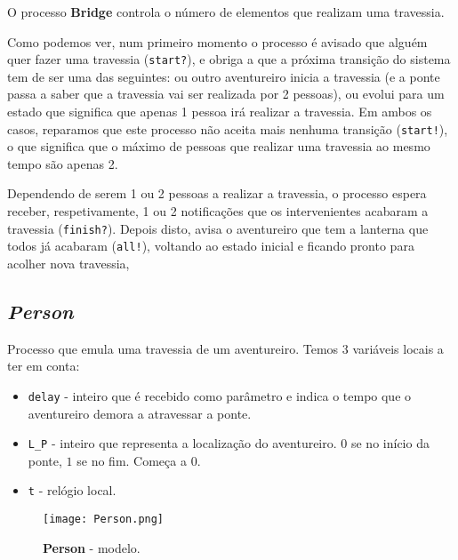 \documentclass[12pt]{extarticle}
\begin{document}
O processo \textbf{Bridge} controla o número de elementos que realizam uma travessia.

Como podemos ver, num primeiro momento o processo é avisado que alguém quer fazer uma travessia (\texttt{start?}), e obriga a que a próxima transição do sistema tem de ser uma das seguintes: ou outro aventureiro inicia a travessia (e a ponte passa a saber que a travessia vai ser realizada por 2 pessoas), ou evolui para um estado que significa que apenas 1 pessoa irá realizar a travessia.
Em ambos os casos, reparamos que este processo não aceita mais nenhuma transição (\texttt{start!}), o que significa que o máximo de pessoas que realizar uma travessia ao mesmo tempo são apenas 2.

Dependendo de serem 1 ou 2 pessoas a realizar a travessia, o processo espera receber, respetivamente, 1 ou 2 notificações que os intervenientes acabaram a travessia (\texttt{finish?}).
Depois disto, avisa o aventureiro que tem a lanterna que todos já acabaram (\texttt{all!}), voltando ao estado inicial e ficando pronto para acolher nova travessia,

\subsection{\textit{Person}}
Processo que emula uma travessia de um aventureiro.
Temos 3 variáveis locais a ter em conta:
\begin{itemize}
	\item \texttt{delay} - inteiro que é recebido como parâmetro e indica o tempo que o aventureiro demora a atravessar a ponte.
	\item \texttt{L\_P} - inteiro que representa a localização do aventureiro. $0$ se no início da ponte, $1$ se no fim. Começa a $0$.
	\item \texttt{t} - relógio local.
\end{itemize}

\begin{figure}[H]
	\centering
	\texttt{[image: Person.png]}
	\caption{\textbf{Person} - modelo.}
\end{figure}
\end{document}
